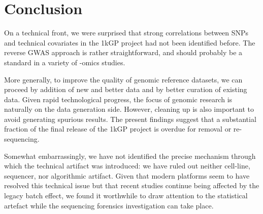 \documentclass[9pt,lineno]{elife}
\begin{document}
\section{Conclusion}

On a technical front, we were surprised that strong correlations between SNPs and technical covariates in the 1kGP project had not been identified before. The reverse GWAS approach is rather straightforward, and should probably be a standard in a variety of -omics studies. 

More generally, to improve the quality of genomic reference datasets, we can proceed by addition of new and better data and by better curation of existing data. Given rapid technological progress, the focus of genomic research is naturally on the data generation side. However, cleaning up is also important to avoid generating spurious results. The present findings suggest that a substantial fraction of the final release of the 1kGP project is overdue for removal or re-sequencing. 

Somewhat embarrassingly, we have not identified the precise mechanism through which the technical artifact was introduced: we have ruled out neither cell-line, sequencer, nor algorithmic artifact. Given that modern platforms seem to have resolved this technical issue but that recent studies continue being affected by the legacy batch effect, we found it worthwhile to draw attention to the statistical artefact while the sequencing forensics investigation can take place.     


 


\end{document}
